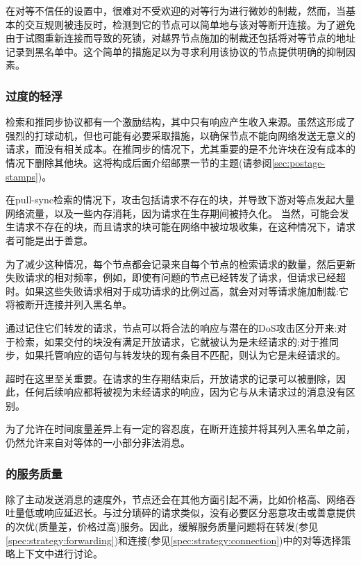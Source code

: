 在对等不信任的设置中，很难对不受欢迎的对等行为进行微妙的制裁，然而，当基本的交互规则被违反时，检测到它的节点可以简单地与该对等断开连接。为了避免由于试图重新连接而导致的死锁，对越界节点施加的制裁还包括将对等节点的地址记录到黑名单中。这个简单的措施足以为寻求利用该协议的节点提供明确的抑制因素。 

\subsubsection{过度的轻浮}

检索和推同步协议都有一个激励结构，其中只有响应产生收入来源。虽然这形成了强烈的打球动机，但也可能有必要采取措施，以确保节点不能向网络发送无意义的请求，而没有相关成本。在推同步的情况下，尤其重要的是不允许块在没有成本的情况下删除其他块。这将构成后面介绍邮票一节的主题(请参阅\ref{sec:postage-stamps})。

在pull-sync检索的情况下，攻击包括请求不存在的块，并导致下游对等点发起大量网络流量，以及一些内存消耗，因为请求在生存期间被持久化。
当然，可能会发生请求不存在的块，而且请求的块可能在网络中被垃圾收集，在这种情况下，请求者可能是出于善意。

为了减少这种情况，每个节点都会记录来自每个节点的检索请求的数量，然后更新失败请求的相对频率，例如，即使有问题的节点已经转发了请求，但请求已经超时。如果这些失败请求相对于成功请求的比例过高，就会对对等请求施加制裁:它将被断开连接并列入黑名单。

% 
%

通过记住它们转发的请求，节点可以将合法的响应与潜在的DoS攻击区分开来:对于检索，如果交付的块没有满足开放请求，它就被认为是未经请求的;对于推同步，如果托管响应的语句与转发块的现有条目不匹配，则认为它是未经请求的。

超时在这里至关重要。在请求的生存期结束后，开放请求的记录可以被删除，因此，任何后续响应都将被视为未经请求的响应，因为它与从未请求过的消息没有区别。

为了允许在时间度量差异上有一定的容忍度，在断开连接并将其列入黑名单之前，仍然允许来自对等体的一小部分非法消息。

\subsubsection{的服务质量}

除了主动发送消息的速度外，节点还会在其他方面引起不满，比如价格高、网络吞吐量低或响应延迟长。与过分琐碎的请求类似，没有必要区分恶意攻击或善意提供的次优(质量差，价格过高)服务。因此，缓解服务质量问题将在转发(参见\ref{spec:strategy:forwarding})和连接(参见\ref{spec:strategy:connection})中的对等选择策略上下文中进行讨论。

